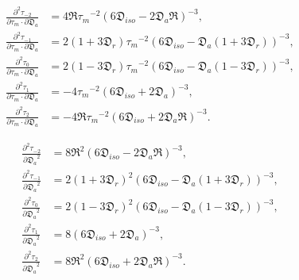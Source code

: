 \documentclass[a4paper,11pt,twoside,openright]{book}
\def\lthtmlcheckvsize{\ifdim\ht\sizebox<\vsize 
  \ifdim\wd\sizebox<\hsize\expandafter\hfill\fi \expandafter\vfill
  \else\expandafter\vss\fi}%
\begin{document}
{\newpage\clearpage
\setcounter{equation}{141}
%
\begin{subequations}\begin{align}
\frac{\partial^2 \tau_{-2}}{\partial \tau_m \cdot \partial \mathfrak{D}_a} &= 4\mathfrak{R} {\tau_m}^{-2} (6\mathfrak{D}_{iso} - 2\mathfrak{D}_a\mathfrak{R})^{-3}, \\
\frac{\partial^2 \tau_{-1}}{\partial \tau_m \cdot \partial \mathfrak{D}_a} &= 2(1 + 3\mathfrak{D}_r){\tau_m}^{-2} (6\mathfrak{D}_{iso} - \mathfrak{D}_a (1 + 3\mathfrak{D}_r))^{-3}, \\
\frac{\partial^2 \tau_{0}}{\partial \tau_m \cdot \partial \mathfrak{D}_a}  &= 2(1 - 3\mathfrak{D}_r){\tau_m}^{-2} (6\mathfrak{D}_{iso} - \mathfrak{D}_a (1 - 3\mathfrak{D}_r))^{-3}, \\
\frac{\partial^2 \tau_{1}}{\partial \tau_m \cdot \partial \mathfrak{D}_a}  &= -4{\tau_m}^{-2} (6\mathfrak{D}_{iso} + 2\mathfrak{D}_a)^{-3}, \\
\frac{\partial^2 \tau_{2}}{\partial \tau_m \cdot \partial \mathfrak{D}_a}  &= -4\mathfrak{R} {\tau_m}^{-2} (6\mathfrak{D}_{iso} + 2\mathfrak{D}_a\mathfrak{R})^{-3}.
\end{align}\end{subequations}%
\lthtmldisplayZ
\lthtmlcheckvsize\clearpage}

{\newpage\clearpage
\setcounter{equation}{143}
%
\begin{subequations}\begin{align}
\frac{\partial^2 \tau_{-2}}{{\partial \mathfrak{D}_a}^2} &= 8\mathfrak{R}^2 (6\mathfrak{D}_{iso} - 2\mathfrak{D}_a\mathfrak{R})^{-3}, \\
\frac{\partial^2 \tau_{-1}}{{\partial \mathfrak{D}_a}^2} &= 2(1 + 3\mathfrak{D}_r)^2 (6\mathfrak{D}_{iso} - \mathfrak{D}_a (1 + 3\mathfrak{D}_r))^{-3}, \\
\frac{\partial^2 \tau_{0}}{{\partial \mathfrak{D}_a}^2}  &= 2(1 - 3\mathfrak{D}_r)^2 (6\mathfrak{D}_{iso} - \mathfrak{D}_a (1 - 3\mathfrak{D}_r))^{-3}, \\
\frac{\partial^2 \tau_{1}}{{\partial \mathfrak{D}_a}^2}  &= 8 (6\mathfrak{D}_{iso} + 2\mathfrak{D}_a)^{-3}, \\
\frac{\partial^2 \tau_{2}}{{\partial \mathfrak{D}_a}^2}  &= 8\mathfrak{R}^2 (6\mathfrak{D}_{iso} + 2\mathfrak{D}_a\mathfrak{R})^{-3}.
\end{align}\end{subequations}%
\lthtmldisplayZ
\lthtmlcheckvsize\clearpage}
\end{document}
